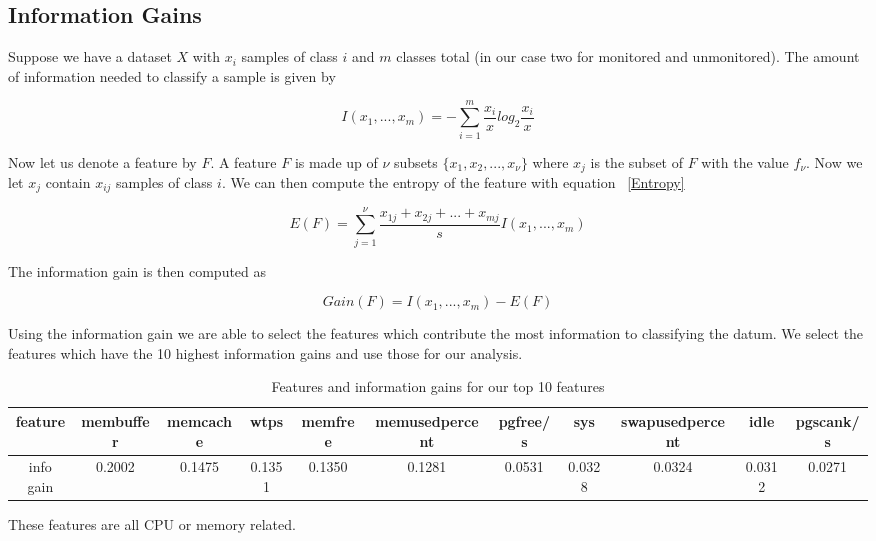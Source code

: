 \subsection{Information Gains}
Suppose we have a dataset $X$ with $x_i$ samples of class $i$ and $m$ classes total (in our case two for monitored and unmonitored). The amount of information needed to classify a sample is given by 

\begin{equation}\label{InfoGain}
	I(x_1,...,x_m)=-\sum_{i=1}^{m}\frac{x_i}{x}log_2 \frac{x_i}{x}
\end{equation}

Now let us denote a feature by $F$. A feature $F$ is made up of $\nu$ subsets $\{x_1,x_2,...,x_\nu \}$ where $x_j$ is the subset of $F$ with the value $f_\nu$. Now we let $x_j$ contain $x_{ij}$ samples of class $i$. We can then compute the entropy of the feature with equation ~\ref{Entropy} 

\begin{equation}\label{Entropy}
	E(F) = \sum_{j=1}^{\nu} \frac{x_{1j}+x_{2j}+...+x_{mj}}{s}I(x_1,...,x_m)
\end{equation}

The information gain is then computed as 

\begin{equation}\label{Gain}
	Gain(F)=I(x_1,...,x_m)-E(F)
\end{equation}

Using the information gain we are able to select the features which contribute the most information to classifying the datum. We select the features which have the 10 highest information gains and use those for our analysis. 

\begin{table}\label{InfoGainTable}
\centering
  \begin{tabularx}{\textwidth}{| c | c | c | c | c | c | c | c | c | c | c |}
  \hline
  feature & membuffer & memcache & wtps & memfree & memusedpercent & pgfree/s & sys & swapusedpercent & idle & pgscank/s \\ \hline
  info gain & 0.2002 &  0.1475 & 0.1351 & 0.1350 & 0.1281 & 0.0531 & 0.0328 & 0.0324 & 0.0312 & 0.0271 \\ \hline
  \end{tabularx}
  \caption{Features and information gains for our top 10 features}
\end{table}

These features are all CPU or memory related. 

